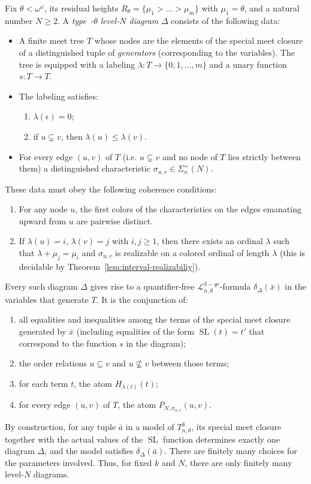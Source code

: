 \documentclass{amsart}
\theoremstyle{definition}
\begin{document}
Fix $\theta<\omega^\omega$, its residual heights $R_\theta=\{\mu_1>\dots>\mu_m\}$ with $\mu_1=\theta$, and a natural number $N\ge 2$. A \emph{type~{\MakeUppercase{}}-$\theta$ level-$N$ diagram} $\Delta$ consists of the following data:
\begin{itemize}
    \item A finite meet tree $T$ whose nodes are the elements of the special meet closure of a distinguished tuple of \emph{generators} (corresponding to the variables). The tree is equipped with a labeling $\lambda: T\to\{0,1,\dots,m\}$ and a unary function $s: T\to T$.
    \item The labeling satisfies:
    \begin{enumerate}[label=(\roman*)]
        \item $\lambda(\epsilon)=0$;
        \item if $u\subsetneq v$, then $\lambda(u)\le\lambda(v)$.
    \end{enumerate}
    \item For every edge $(u,v)$ of $T$ (i.e. $u\subsetneq v$ and no node of $T$ lies strictly between them) a distinguished characteristic $\sigma_{u,v}\in\Sigma_n^{+}(N)$.
\end{itemize}
These data must obey the following coherence conditions:
\begin{enumerate}[label=(\roman*)]
    \item For any node $u$, the first colors of the characteristics on the edges emanating upward from $u$ are pairwise distinct.
    \item If $\lambda(u)=i$, $\lambda(v)=j$ with $i,j\ge 1$, then there exists an ordinal $\lambda$ such that $\lambda+\mu_j=\mu_i$ and $\sigma_{u,v}$ is realizable on a colored ordinal of length $\lambda$ (this is decidable by Theorem~\ref{lem:interval-realizabiliy}).
\end{enumerate}

Every such diagram $\Delta$ gives rise to a quantifier-free $\mathcal{L}_{n,\theta}^{3-qe}$-formula $\delta_\Delta(\bar x)$ in the variables that generate $T$. It is the conjunction of:
\begin{enumerate}[label=(\alph*)]
    \item all equalities and inequalities among the terms of the special meet closure generated by $\bar x$ (including equalities of the form $\operatorname{SL}(t)=t'$ that correspond to the function $s$ in the diagram);
    \item the order relations $u\subseteq v$ and $u\not\subseteq v$ between those terms;
    \item for each term $t$, the atom $H_{\lambda(t)}(t)$;
    \item for every edge $(u,v)$ of $T$, the atom $P_{N,\sigma_{u,v}}(u,v)$.
\end{enumerate}
By construction, for any tuple $\bar a$ in a model of $T_{n,\theta}^{3}$, its special meet closure together with the actual values of the $\operatorname{SL}$ function determines exactly one diagram $\Delta$, and the model satisfies $\delta_\Delta(\bar a)$. There are finitely many choices for the parameters involved. Thus, for fixed $k$ and $N$, there are only finitely many level-$N$ diagrams.
\end{document}
